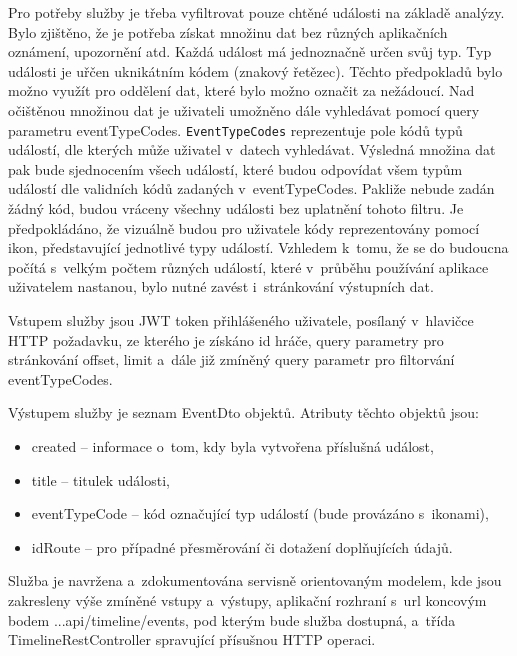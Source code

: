 \documentclass[12pt]{article}
\begin{document}
{\clearpage


\obrazek
{}

Pro potřeby služby je třeba vyfiltrovat pouze chtěné události na základě analýzy.
Bylo zjištěno, že je potřeba získat množinu dat bez různých aplikačních oznámení, upozornění atd.
Každá událost má jednoznačně určen svůj typ.
Typ události je uřčen uknikátním kódem (znakový řetězec).
Těchto předpokladů bylo možno využít pro oddělení dat, které bylo možno označit za nežádoucí.
Nad očištěnou množinou dat je uživateli umožněno dále vyhledávat pomocí query parametru eventTypeCodes.
\texttt{EventTypeCodes} reprezentuje pole kódů typů událostí, dle kterých může uživatel v~datech vyhledávat.
Výsledná množina dat pak bude sjednocením všech událostí,
které budou odpovídat všem typům událostí dle validních kódů zadaných v~eventTypeCodes.
Pakliže nebude zadán žádný kód, budou vráceny všechny události bez uplatnění tohoto filtru.
Je předpokládáno, že vizuálně budou pro uživatele kódy reprezentovány pomocí ikon,
představující jednotlivé typy událostí.
Vzhledem k~tomu, že se do budoucna počítá s~velkým počtem různých událostí, 
které v~průběhu používání aplikace uživatelem nastanou, 
bylo nutné zavést i~stránkování výstupních dat. 

Vstupem služby jsou JWT token přihlášeného uživatele, posílaný v~hlavičce HTTP požadavku,
ze kterého je získáno id hráče, query parametry pro stránkování offset, limit
a~dále již zmíněný query parametr pro filtorvání eventTypeCodes. 

Výstupem služby je seznam EventDto objektů.
Atributy těchto objektů jsou: 
\begin{itemize}
\item created -- informace o~tom, kdy byla vytvořena příslušná událost,
\item title -- titulek události,
\item eventTypeCode -- kód označující typ událostí (bude provázáno s~ikonami),
\item idRoute -- pro případné přesměrování či dotažení doplňujících údajů.
\end{itemize}


Služba je navržena a~zdokumentována servisně orientovaným modelem, kde jsou zakresleny výše zmíněné vstupy a~výstupy, 
aplikační rozhraní s~url koncovým bodem  ...api/timeline/events, pod kterým bude služba dostupná,
a~třída TimelineRestController spravující přísušnou HTTP operaci.

}
\end{document}
